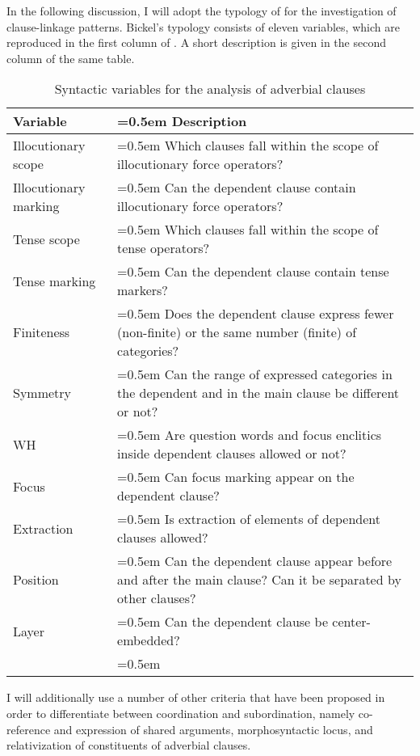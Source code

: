 In the following discussion, I will adopt the typology of \citet{Bickel2010} for the investigation of clause-linkage patterns. Bickel's typology consists of eleven variables, which are reproduced in the first column of . A short description is given in the second column of the same table. 
%
\begin{table}
	\caption{Syntactic variables for the analysis of adverbial clauses}
	\label{tab:Syntactic variables for the analysis of adverbial clauses}
	\small
	\begin{tabularx}{0.98\textwidth}[]{%
		>{\raggedright\arraybackslash}p{90pt}
		>{\raggedright\arraybackslash\hangindent=0.5em}X}
		
		\lsptoprule
			Variable			&	Description\\
		\midrule
			Illocutionary scope		&	Which clauses fall within the scope of illocutionary force operators?\\
			Illocutionary marking	&	Can the dependent clause contain illocutionary force operators?\\
			Tense scope			&	Which clauses fall within the scope of tense operators?\\
			Tense marking		&	Can the dependent clause contain tense markers?\\
			Finiteness			&	Does the dependent clause express fewer (non-finite) or the same number (finite) of categories?\\
			Symmetry			&	Can the range of expressed categories in the dependent and in the main clause be different or not?\\
			WH				&	Are question words and focus enclitics inside dependent clauses allowed or not?\\
			Focus				&	Can focus marking appear on the dependent clause?\\
			Extraction			&	Is extraction of elements of dependent clauses allowed?\\
			Position			&	Can the dependent clause appear before and after the main clause? Can it be separated by other clauses?\\
			Layer				&	Can the dependent clause be center-embedded?\\
		\lspbottomrule
	\end{tabularx}
\end{table}

I will additionally use a number of other criteria that have been proposed in order to differentiate between coordination and subordination, namely co-reference and expression of shared arguments, morphosyntactic locus, and relativization of constituents of adverbial clauses.

